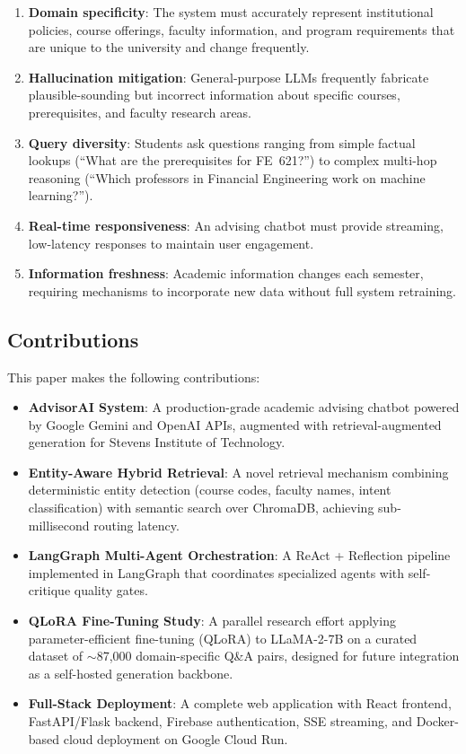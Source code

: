\documentclass[conference,compsoc]{IEEEtran}
\begin{document}
\begin{enumerate}
    \item \textbf{Domain specificity}: The system must accurately represent institutional policies, course offerings, faculty information, and program requirements that are unique to the university and change frequently.
    \item \textbf{Hallucination mitigation}: General-purpose LLMs frequently fabricate plausible-sounding but incorrect information about specific courses, prerequisites, and faculty research areas.
    \item \textbf{Query diversity}: Students ask questions ranging from simple factual lookups (``What are the prerequisites for FE~621?'') to complex multi-hop reasoning (``Which professors in Financial Engineering work on machine learning?'').
    \item \textbf{Real-time responsiveness}: An advising chatbot must provide streaming, low-latency responses to maintain user engagement.
    \item \textbf{Information freshness}: Academic information changes each semester, requiring mechanisms to incorporate new data without full system retraining.
\end{enumerate}

\subsection{Contributions}

This paper makes the following contributions:

\begin{itemize}
    \item \textbf{AdvisorAI System}: A production-grade academic advising chatbot powered by Google Gemini and OpenAI APIs, augmented with retrieval-augmented generation for Stevens Institute of Technology.
    \item \textbf{Entity-Aware Hybrid Retrieval}: A novel retrieval mechanism combining deterministic entity detection (course codes, faculty names, intent classification) with semantic search over ChromaDB, achieving sub-millisecond routing latency.
    \item \textbf{LangGraph Multi-Agent Orchestration}: A ReAct + Reflection pipeline implemented in LangGraph that coordinates specialized agents with self-critique quality gates.
    \item \textbf{QLoRA Fine-Tuning Study}: A parallel research effort applying parameter-efficient fine-tuning (QLoRA) to LLaMA-2-7B on a curated dataset of ${\sim}$87,000 domain-specific Q\&A pairs, designed for future integration as a self-hosted generation backbone.
    \item \textbf{Full-Stack Deployment}: A complete web application with React frontend, FastAPI/Flask backend, Firebase authentication, SSE streaming, and Docker-based cloud deployment on Google Cloud Run.
\end{itemize}
\end{document}
